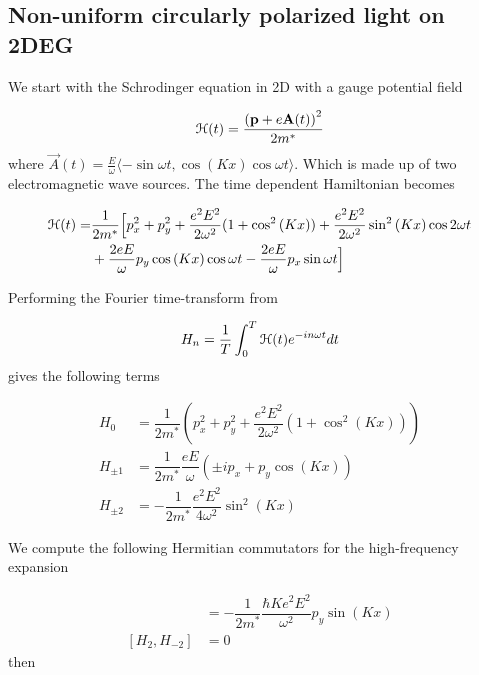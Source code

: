 \subsection{Non-uniform circularly polarized light on 2DEG} \label{fll-2deg-derivation}

We start with the Schrodinger equation in 2D with a gauge potential field

\begin{equation}
  \mathcal{H}(t) = \dfrac{\left(\mathbf{p} + e\mathbf{A}(t) \right)^2}{2m^*}
\end{equation}
where $\vec{A}(t) = \tfrac{E}{\omega} \langle -\sin{\omega t} , \cos{(Kx)}\cos{\omega t} \rangle$.
Which is made up of two electromagnetic wave sources.
The time dependent Hamiltonian becomes

\begin{equation}
\begin{split}
  \mathcal{H}(t) = &\dfrac{1}{2m^*} \Big[ p_x^2 + p_y^2 + \dfrac{e^2 E^2}{2\omega^2}(1+\cos^2{(Kx)}) + \dfrac{e^2 E^2}{2\omega^2}\sin^2{(Kx)} \cos{2\omega t} \\
  &+ \dfrac{2eE}{\omega} p_y \cos{(Kx)} \cos{\omega t} - \dfrac{2eE}{\omega} p_x \sin{\omega t} \Big]
\end{split}
\end{equation}

Performing the Fourier time-transform from

\begin{equation}
  H_n = \dfrac{1}{T} \int_{0}^{T} \mathcal{H}(t) e^{-in\omega t} dt
\end{equation}
gives the following terms

\begin{align}
  H_0 &= \dfrac{1}{2m^*} \left( p_x^2 + p_y^2 + \dfrac{e^2 E^2}{2 \omega^2} (1+\cos^2{(Kx)}) \right) \\
  H_{\pm1} &= \dfrac{1}{2m^*} \dfrac{eE}{\omega}\left( \pm i p_x + p_y \cos{(Kx)} \right) \\
  H_{\pm2} &= -\dfrac{1}{2m^*} \dfrac{e^2 E^2}{4\omega^2} \sin^2{(Kx)}
\end{align}

We compute the following Hermitian commutators for the high-frequency expansion

\begin{align}
  [H_{1}, H_{-1}] &= -\dfrac{1}{2m^*} \dfrac{\hbar K e^2 E^2}{\omega^2} p_y \sin{(Kx)} \\
  [H_{2}, H_{-2}] &= 0
\end{align}
then

